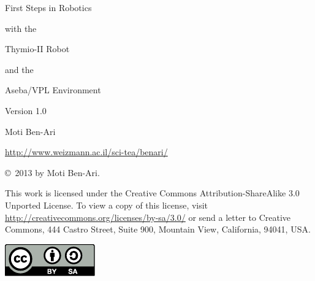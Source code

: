 \thispagestyle{empty}

\begin{center}
\begin{bfseries}
\begin{LARGE}
First Steps in Robotics

with the

Thymio-II Robot

and the

Aseba/VPL Environment

\bigskip

Version 1.0

\bigskip\bigskip\bigskip\bigskip

Moti Ben-Ari

\bigskip
\end{LARGE}

\begin{Large}
\url{http://www.weizmann.ac.il/sci-tea/benari/}
\end{Large}
\end{bfseries}
\end{center}

\vfill

\begin{center}
\copyright{}\  2013 by Moti Ben-Ari. 
\end{center}

This work is licensed under the Creative Commons
Attribution-ShareAlike 3.0 Unported License. To view a copy
of this license, visit
\url{http://creativecommons.org/licenses/by-sa/3.0/}
or send a letter to Creative Commons, 444 Castro Street, Suite 900,
Mountain View, California, 94041, USA.

\begin{center}
\includegraphics[width=.2\textwidth]{../images/by-sa}
\end{center}

\tableofcontents
\thispagestyle{empty}
